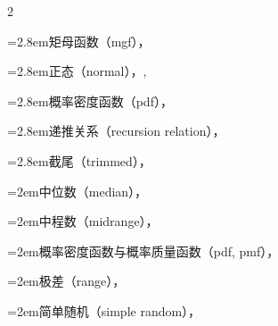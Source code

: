 \begin{multicols}{2}
\par\noindent\hangindent=2.8em\hspace*{1.8em}\label{idx:925}矩母函数（mgf），\hyperref[thm:5.2.7]{\pageref*{thm:5.2.7}}\par
\par\noindent\hangindent=2.8em\hspace*{1.8em}\label{idx:926}正态（normal），\hyperref[ex:5.2.8]{\pageref*{ex:5.2.8}}, \hyperref[thm:5.3.1]{\pageref*{thm:5.3.1}}\par
\par\noindent\hangindent=2.8em\hspace*{1.8em}\label{idx:927}概率密度函数（pdf），\hyperref[exercise:5.5]{\pageref*{exercise:5.5}}\par
\par\noindent\hangindent=2.8em\hspace*{1.8em}\label{idx:928}递推关系（recursion relation），\hyperref[exercise:5.15]{\pageref*{exercise:5.15}}\par
\par\noindent\hangindent=2.8em\hspace*{1.8em}\label{idx:929}截尾（trimmed），\hyperref[idxocc:929:442]{\pageref*{idxocc:929:442}}\par
\par\noindent\hangindent=2em\hspace*{1em}\label{idx:930}中位数（median），\hyperref[eq:5.4.1]{\pageref*{eq:5.4.1}}\par
\par\noindent\hangindent=2em\hspace*{1em}\label{idx:931}中程数（midrange），\hyperref[ex:5.4.7]{\pageref*{ex:5.4.7}}\par
\par\noindent\hangindent=2em\hspace*{1em}\label{idx:932}概率密度函数与概率质量函数（pdf, pmf），\hyperref[eq:5.1.1]{\pageref*{eq:5.1.1}}\par
\par\noindent\hangindent=2em\hspace*{1em}\label{idx:933}极差（range），\hyperref[idxocc:933:215]{\pageref*{idxocc:933:215}}\par
\par\noindent\hangindent=2em\hspace*{1em}\label{idx:934}简单随机（simple random），\hyperref[idxocc:934:202]{\pageref*{idxocc:934:202}}\par

\end{multicols}
